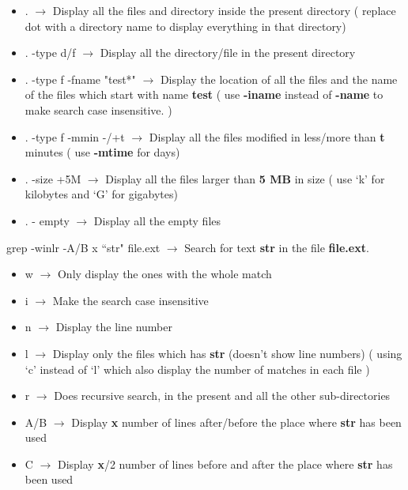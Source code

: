 \documentclass[twoside,a4paper]{article}
\newcommand{\tcb}{\color{blue}} \newcommand{\tcc}{\color{cyan}} \newcommand{\tcr}{\color{red}}
\newcommand{\tcg}{\color{gray}} \newcommand{\tco}{\color{orange}} \newcommand{\tcp}{\color{purple}}
\newcommand{\tck}{\color{black}}
\newcommand{\ra }{$\rightarrow$ }
\newcommand{\hs}{\hspace}
\begin{document}
\begin{multicols}{2}
    \tck
    \begin{itemize}
        \item \tcb  . \tck \ra Display all the files and directory inside the present directory (
              replace dot with a directory name to display everything in that directory)
        \item \tcb  . -type d/f \tck \ra Display all the directory/file in the present directory
        \item \tcb  . -type f -fname "test*" \tck \ra Display the location of all the files and the
              name of the files which start with name \textbf{test} \tcg  ( use \textbf{-iname}
              instead of \textbf{-name} to make search case insensitive. )\tck
        \item \tcb  . -type f -mmin -/+t \tck \ra Display all the files modified in less/more than
              \textbf{t} minutes \tcg ( use \textbf{-mtime} for days)
              \tck
        \item \tck  \tcb  . -size +5M \tck  \ra Display all the files larger than \textbf{5 MB} in
              size \tcg ( use `k' for kilobytes and `G' for gigabytes)\tck
        \item \tck  \tcb  . - empty \tck \ra Display all the empty files
    \end{itemize}

    \hs{-0.6 cm}\tcr  grep \tcb  -winlr -A/B x ``str" file.ext \tck  \ra Search for text
    \textbf{str} in the file \textbf{file.ext}.\\
    \tck
    \begin{itemize}
        \item \tcr  w \tck  \ra Only display the ones with the whole match
        \item \tcr  i \tck  \ra Make the search case insensitive
        \item \tcr  n \tck  \ra Display the line number \item \tcr  l \tck  $\rightarrow$ Display
              only the files which has \textbf{str} (doesn't show line numbers) \tcg ( using `c'
              instead of `l' which also display the number of matches in each file ) \tck
        \item \tcr  r \tck  \ra Does recursive search, in the present and all the other
              sub-directories
        \item \tcr  \tck  A/B \ra Display \textbf{x} number of lines after/before the place where
              \textbf{str} has been used
        \item \tcr  C \tck  \ra Display \textbf{x}/2 number of lines before and after the place
              where \textbf{str} has been used
    \end{itemize}


\end{multicols}
\end{document}
